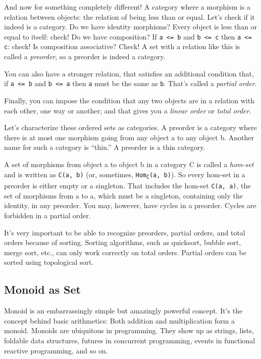 And now for something completely different! A category where a morphism
is a relation between objects: the relation of being less than or equal.
Let's check if it indeed is a category. Do we have identity morphisms?
Every object is less than or equal to itself: check! Do we have
composition? If \texttt{a <= b} and \texttt{b <= c} then \texttt{a
<= c}: check! Is composition associative? Check! A set with a
relation like this is called a \emph{preorder}, so a preorder is indeed
a category.

You can also have a stronger relation, that satisfies an additional
condition that, if \texttt{a <= b} and \texttt{b <= a} then \texttt{a} must be
the same as \texttt{b}. That's called a \emph{partial order}.

Finally, you can impose the condition that any two objects are in a
relation with each other, one way or another; and that gives you a
\emph{linear order} or \emph{total order}.

Let's characterize these ordered sets as categories. A preorder is a
category where there is at most one morphism going from any object a to
any object b. Another name for such a category is ``thin.'' A preorder
is a thin category.

A set of morphisms from object a to object b in a category C is called a
\emph{hom-set} and is written as \texttt{C(a, b)} (or, sometimes,
\texttt{Hom\textsubscript{C}(a, b)}). So every hom-set in a preorder is either
empty or a singleton. That includes the hom-set \texttt{C(a, a)}, the set of
morphisms from a to a, which must be a singleton, containing only the
identity, in any preorder. You may, however, have cycles in a preorder.
Cycles are forbidden in a partial order.

It's very important to be able to recognize preorders, partial orders,
and total orders because of sorting. Sorting algorithms, such as
quicksort, bubble sort, merge sort, etc., can only work correctly on
total orders. Partial orders can be sorted using topological sort.

\subsection{Monoid as Set}\label{monoid-as-set}

Monoid is an embarrassingly simple but amazingly powerful concept. It's
the concept behind basic arithmetics: Both addition and multiplication
form a monoid. Monoids are ubiquitous in programming. They show up as
strings, lists, foldable data structures, futures in concurrent
programming, events in functional reactive programming, and so on.

